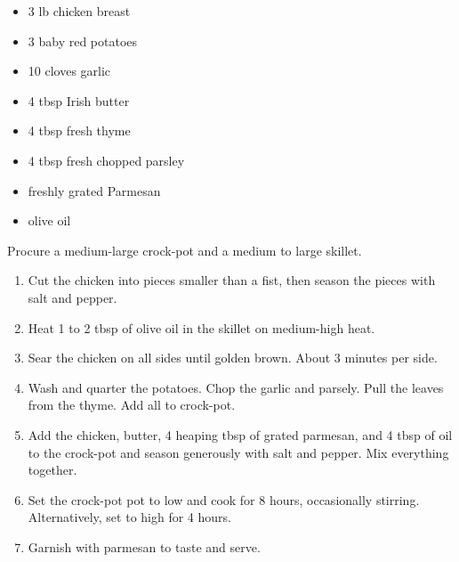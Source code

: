 \documentclass{article}
\begin{document}




\thispagestyle{firstpage}

\ingredients
\begin{multicols}{2}
\begin{itemize}
    \item 3 lb chicken breast
    \item 3 baby red potatoes
    \item 10 cloves garlic
    \item 4 tbsp Irish butter
    \item 4 tbsp fresh thyme
    \item 4 tbsp fresh chopped parsley
    \item freshly grated Parmesan
    \item olive oil
\end{itemize}
\columnbreak
\end{multicols}

\instructions
Procure a medium-large crock-pot and a medium to large skillet.
\begin{enumerate}
    \item Cut the chicken into pieces smaller than a fist, then season the pieces with salt and pepper.
    \item Heat 1 to 2 tbsp of olive oil in the skillet on medium-high heat.
    \item Sear the chicken on all sides until golden brown. About 3 minutes per side.
    \item Wash and quarter the potatoes. Chop the garlic and parsely. Pull the leaves from the thyme. Add all to crock-pot.
    \item Add the chicken, butter, 4 heaping tbsp of grated parmesan, and 4 tbsp of oil to the crock-pot and season generously with salt and pepper. Mix everything together.
    \item Set the crock-pot pot to low and cook for 8 hours, occasionally stirring. Alternatively, set to high for 4 hours.
    \item Garnish with parmesan to taste and serve.
\end{enumerate}
\end{document}

